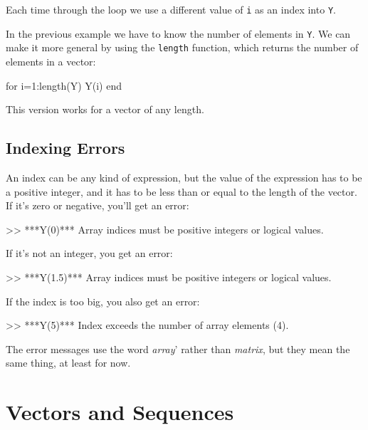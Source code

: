 Each time through the loop we use a different value of \lstinline{i}
as an index into \lstinline{Y}.


In the previous example we have to know the number
of elements in \lstinline{Y}.  We can make it more general by using
the \lstinline{length} function, which returns the number of elements
in a vector:

\begin{code}
for i=1:length(Y)
     Y(i)
end
\end{code}

This version works for a vector of any length.


\subsection{Indexing Errors}


An index can be any kind of expression, but the value of the
expression has to be a positive integer, and it has to be
less than or equal to the length of the vector.  If it's
zero or negative, you'll get an error:

\begin{code}
>> ***Y(0)***
Array indices must be positive integers or logical values.
\end{code}

If it's not an integer, you get an error:

\begin{code}
>> ***Y(1.5)***
Array indices must be positive integers or logical values.
\end{code}

If the index is too big, you also get an error:

\begin{code}
>> ***Y(5)***
Index exceeds the number of array elements (4).
\end{code}

The error messages use the word {\em array}' rather than {\em matrix}, 
but they mean the same thing, at least for now.


\section{Vectors and Sequences}
\label{vecseq}

